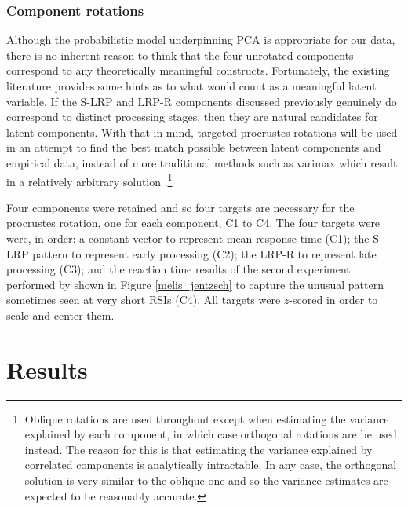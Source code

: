 \documentclass{apa}[12pt]
\begin{document}
\subsubsection{Component rotations}

Although the probabilistic model underpinning PCA is appropriate for our data, there is no inherent reason to think that the four unrotated components correspond to any theoretically meaningful constructs. Fortunately, the existing literature provides some hints as to what would count as a meaningful latent variable. If the S-LRP and LRP-R components discussed previously genuinely do correspond to distinct processing stages, then they are natural candidates for latent components. With that in mind, targeted procrustes rotations will be used in an attempt to find the best match possible between latent components and empirical data, instead of more traditional methods such as varimax which result in a relatively arbitrary solution \cite{Gorsuch83}.\footnote{Oblique rotations are used throughout except when estimating the variance explained by each component, in which case orthogonal rotations are be used instead. The reason for this is that estimating the variance explained by correlated components is analytically intractable. In any case, the orthogonal solution is very similar to the oblique one and so the variance estimates are expected to be reasonably accurate.}

Four components were retained and so four targets are necessary for the procrustes rotation, one for each component, C1 to C4. The four targets were were, in order: a constant vector to represent mean response time (C1); the S-LRP pattern to represent early processing (C2); the LRP-R to represent late processing (C3); and the reaction time results of the second experiment performed by  shown in Figure \ref{melis_jentzsch} to capture the unusual pattern sometimes seen at very short RSIs (C4). All targets were $z$-scored in order to scale and center them.

\section{Results}
\end{document}
